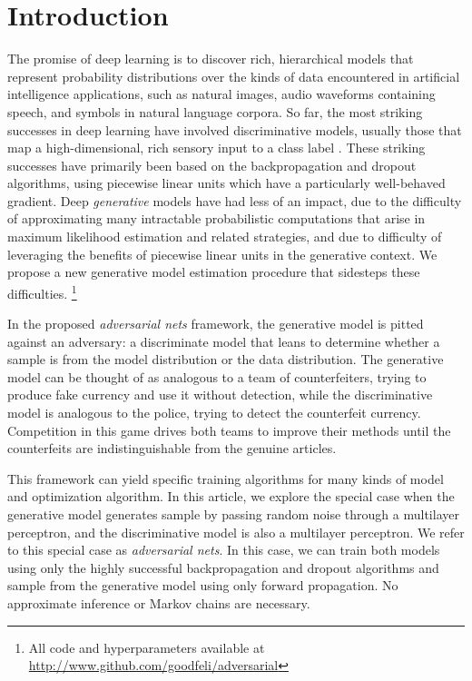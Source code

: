 \section{Introduction}
The promise of deep learning is to discover rich, hierarchical models \cite{2_MAL-006} that represent probability distributions over the kinds of data encountered in artificial intelligence applications, such as natural images, audio waveforms containing speech, and symbols in natural language corpora. So far, the most striking successes in deep learning have involved discriminative models, usually those that map a high-dimensional, rich sensory input to a class label \cite{14_6296526, 22_NIPS2012_c399862d}. These striking successes have primarily been based on the backpropagation and dropout algorithms, using piecewise linear units \cite{19_5459469,9_pmlr-v15-glorot11a,10_goodfellow2013maxoutnetworks} which have a particularly well-behaved gradient. Deep \emph{generative} models have had less of an impact, due to the difficulty of approximating many intractable probabilistic computations that arise in maximum likelihood estimation and related strategies, and due to difficulty of leveraging the benefits of piecewise linear units in the generative context. We propose a new generative model estimation procedure that sidesteps these difficulties.
\footnote{All code and hyperparameters available at \url{http://www.github.com/goodfeli/adversarial}}

\noindent In the proposed \emph{adversarial nets} framework, the generative model is pitted against an adversary: a discriminate model that leans to determine whether a sample is from the model distribution or the data distribution. The generative model can be thought of as analogous to a team of counterfeiters, trying to produce fake currency and use it without detection, while the discriminative model is analogous to the police, trying to detect the counterfeit currency. Competition in this game drives both teams to improve their methods until the counterfeits are indistinguishable
from the genuine articles.

\noindent This framework can yield specific training algorithms for many kinds of model and optimization algorithm. In this article, we explore the special case when the generative model generates sample by passing random noise through a multilayer perceptron, and the discriminative model is also a multilayer perceptron. We refer to this special case as \emph{adversarial nets}. In this case, we can train both models using only the highly successful backpropagation and dropout algorithms \cite{17_hinton2012improvingneuralnetworkspreventing} and sample from the generative model using only forward propagation. No approximate inference or Markov chains are necessary.
